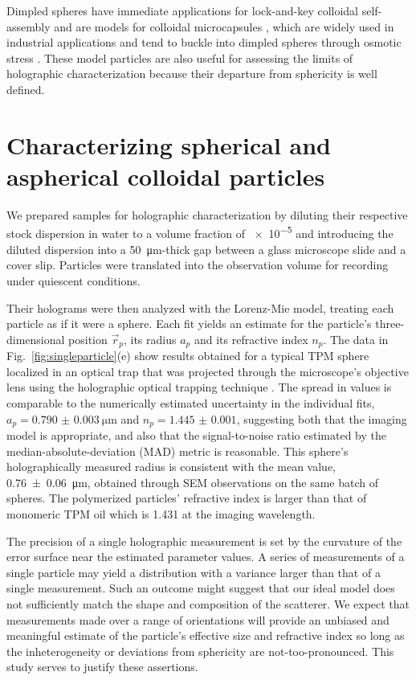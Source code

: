 Dimpled spheres have immediate applications for lock-and-key
colloidal self-assembly
\cite{sacanna10,macfarlane10,sacanna11,ashton13,phillips14,wang14} 
and are models for colloidal microcapsules \cite{chang64}, which are widely
used in industrial applications and tend to buckle into dimpled spheres
through osmotic stress \cite{chang64,knoche11,jose14}. 
These model particles are also useful for assessing the limits of holographic
characterization because their departure from sphericity is well defined.

\section{Characterizing spherical and aspherical colloidal particles}

We prepared samples for holographic characterization
by diluting their respective stock dispersion in water to a volume fraction of
\num{e-5} and introducing the diluted dispersion into a \SI{50}{\um}-thick gap between a
glass microscope slide and a cover slip. Particles were translated into the
observation volume for recording under quiescent conditions. 

Their holograms were then analyzed with the Lorenz-Mie model, treating each
particle as if it were a sphere.
Each fit yields an estimate for the particle's three-dimensional position $\vec{r}_p$,
its radius $a_p$ and its refractive index $n_p$.
The data in Fig.~\ref{fig:singleparticle}(e) show results obtained for
a typical TPM sphere localized in an optical trap that was
projected through the microscope's objective lens using the
holographic optical trapping technique \cite{dufresne98,grier03}.
The spread in values is comparable to the numerically
estimated uncertainty in the individual fits,
$a_p = \SI{0.790(3)}{\um}$ and $n_p = \num{1.445(1)}$,
suggesting both that
the imaging model is appropriate, and also that the signal-to-noise
ratio estimated by the median-absolute-deviation (MAD) metric
is reasonable.
This sphere's holographically measured radius is consistent with the 
mean value, \SI{0.76(6)}{\um}, obtained through SEM observations 
on the same batch of spheres.
The polymerized particles' refractive index is larger 
than that of monomeric TPM oil which is \num{1.431} at the imaging wavelength.

The precision of a single holographic measurement is set by
the curvature of the error surface near the estimated parameter values.
A series of measurements of a single particle may yield a distribution
with a variance larger than that of a single measurement. Such an outcome
might suggest that
our ideal model does not sufficiently match the shape and
composition of the scatterer. We expect that measurements made
over a range of orientations will provide an unbiased and meaningful estimate
of the particle's effective size and refractive index so long
as the inheterogeneity or deviations from sphericity are not-too-pronounced.
This study serves to justify these assertions.

